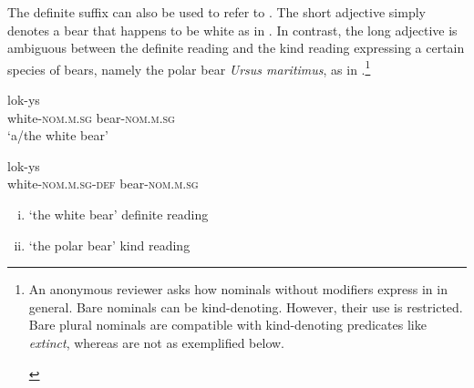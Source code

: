 \documentclass[output=paper,
modfonts
]{langscibook}
\begin{document}
The definite suffix can also be used to refer to  \citep{Rutkowski06}. The short adjective simply denotes a bear that happens to be white as in . \pagebreak In contrast, the long adjective is ambiguous between the definite reading and the kind reading expressing a certain species of bears, namely the polar bear \textit{Ursus maritimus}, as in .\footnote{An anonymous reviewer asks how nominals without modifiers express  in  in general. Bare nominals can be kind-denoting. However, their use is restricted. Bare plural nominals are compatible with kind-denoting predicates like \textit{extinct}, whereas  are not as exemplified below.
	
\begin{exe}
 
\begin{xlist}

\end{xlist}
\end{exe}}

\begin{exe}
\ex \label{ex:sereikaite:11}
\begin{xlist}
\ex \label{ex:sereikaite:11a}
 {lok-ys} \\
white-\textsc{nom.m.sg} bear-\textsc{nom.m.sg} \\
\trans `a/the white bear'  

\ex \label{ex:sereikaite:11b}
 {lok-ys}\\
white-\textsc{nom.m.sg}-\textsc{def} bear-\textsc{nom.m.sg}  \\
\trans 
\begin{enumerate}[(i)]
	\item `the white bear' \checkmark definite reading 
	\item `the polar bear' \checkmark kind reading
\end{enumerate}
 
\end{xlist}
\end{exe}
\end{document}
